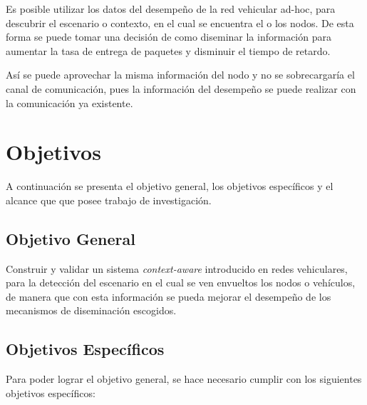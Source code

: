 Es posible utilizar los datos del desempeño de la red vehicular ad-hoc, para descubrir el escenario o contexto, en el cual se encuentra el o los nodos. De esta forma se puede tomar una decisión de como diseminar la información para aumentar la tasa de entrega de paquetes y disminuir el tiempo de retardo.

Así se puede aprovechar la misma información del nodo y no se sobrecargaría el canal de comunicación, pues la información del desempeño se puede realizar con la comunicación ya existente.

\section{Objetivos}
A continuación se presenta el objetivo general, los objetivos específicos y el alcance que que posee trabajo de investigación.

\subsection{Objetivo General}

Construir y validar un sistema \textit{context-aware} introducido en redes vehiculares, para la detección del escenario en el cual se ven envueltos los nodos o vehículos, de manera que con esta información se pueda mejorar el desempeño de los mecanismos de diseminación escogidos.


\subsection{Objetivos Específicos}
Para poder lograr el objetivo general, se hace necesario cumplir con los siguientes objetivos específicos:

